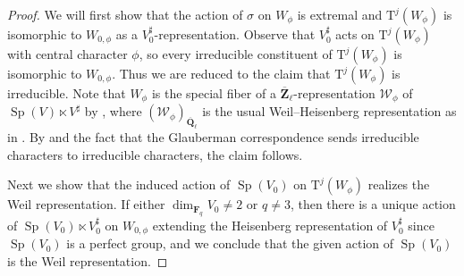 \documentclass[reqno]{amsart}
\numberwithin{equation}{subsection}
\newcommand{\F}{\mathbf{F}}
\newcommand{\Q}{\mathbf{Q}}
\newcommand{\Z}{\mathbf{Z}}
\newcommand{\ol}[1]{\overline{#1}}
\newcommand\cW{\mathcal{W}}
\DeclareMathOperator{\Sp}{Sp}
\newcommand{\rT}{\ensuremath{\mathrm{T}}\xspace}
\theoremstyle{remark}
\numberwithin{equation}{subsection}
\numberwithin{figure}{subsection}
\begin{document}
\begin{proof}
We will first show that the action of $\sigma$ on $W_\phi$ is extremal and $\rT^j(W_\phi)$ is isomorphic to $W_{0,\phi}$ as a $V_0^\sharp$-representation. Observe that $V_0^\sharp$ acts on $\rT^j(W_\phi)$ with central character $\phi$, so every irreducible constituent of $\rT^j(W_\phi)$ is isomorphic to $W_{0,\phi}$. Thus we are reduced to the claim that $\rT^j(W_\phi)$ is irreducible. Note that $W_\phi$ is the special fiber of a $\ol\Z_\ell$-representation $\cW_\phi$ of $\Sp(V) \ltimes V^\sharp$ by \cite[Lemma 2.5]{Fin22}, where $(\cW_\phi)_{\ol\Q_\ell}$ is the usual Weil--Heisenberg representation as in \cite{Ger77}. By \cite[Corollary~3.5.5]{Cot26b} and the fact that the Glauberman correspondence sends irreducible characters to irreducible characters, the claim follows.

Next we show that the induced action of $\Sp(V_0)$ on $\rT^j(W_\phi)$ realizes the Weil representation. If either $\dim_{\F_q} V_0 \neq 2$ or $q \neq 3$, then there is a unique action of $\Sp(V_0) \ltimes V_0^\sharp$ on $W_{0, \phi}$ extending the Heisenberg representation of $V_0^\sharp$ since $\Sp(V_0)$ is a perfect group, and we conclude that the given action of $\Sp(V_0)$ is the Weil representation.


\end{proof}
\end{document}
